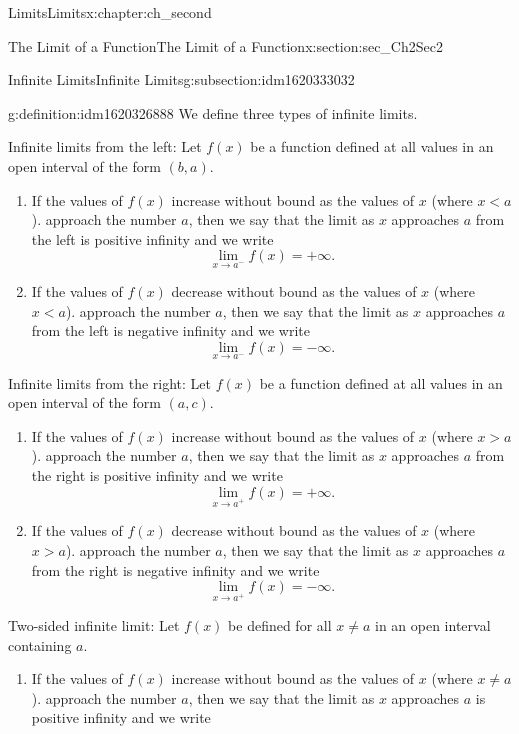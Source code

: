 \documentclass[oneside,10pt,]{book}
\numberwithin{equation}{section}
\newcommand{\lt}{<}
\newcommand{\gt}{>}
\begin{document}
\begin{chapterptx}{Limits}{}{Limits}{}{}{x:chapter:ch_second}
\begin{sectionptx}{The Limit of a Function}{}{The Limit of a Function}{}{}{x:section:sec_Ch2Sec2}
\begin{subsectionptx}{Infinite Limits}{}{Infinite Limits}{}{}{g:subsection:idm1620333032}
\begin{definition}{}{g:definition:idm1620326888}%
We define three types of infinite limits.%
\par
Infinite limits from the left: Let \(f(x)\) be a function defined at all values in an open interval of the form \((b,a).\)%
%
\begin{enumerate}
\item{}If the values of \(f(x)\) increase without bound as the values of \(x\) (where \(x \lt a \)). approach the number \(a \), then we say that the limit as \(x\) approaches \(a \) from the left is positive infinity and we write%
\begin{equation*}
\lim_{x\to a^{-} }f(x)=+\infty.
\end{equation*}
%
\item{}If the values of \(f(x)\) decrease without bound as the values of \(x\) (where \(x \lt a \)). approach the number \(a \), then we say that the limit as \(x\) approaches \(a \) from the left is negative infinity and we write%
\begin{equation*}
\lim_{x\to a^{-} }f(x)=-\infty.
\end{equation*}
%
\end{enumerate}
Infinite limits from the right: Let \(f(x)\) be a function defined at all values in an open interval of the form \((a,c).\)%
%
\begin{enumerate}
\item{}If the values of \(f(x)\) increase without bound as the values of \(x\) (where \(x \gt a \)). approach the number \(a \), then we say that the limit as \(x\) approaches \(a \) from the right is positive infinity and we write%
\begin{equation*}
\lim_{x\to a^{+}}f(x)=+\infty.
\end{equation*}
%
\item{}If the values of \(f(x)\) decrease without bound as the values of \(x\) (where \(x \gt a \)). approach the number \(a \), then we say that the limit as \(x\) approaches \(a \) from the right is negative infinity and we write%
\begin{equation*}
\lim_{x\to a^{+}}f(x)=-\infty.
\end{equation*}
%
\end{enumerate}
Two-sided infinite limit: Let \(f(x)\) be defined for all \(x\neq a\) in an open interval containing \(a \).%
%
\begin{enumerate}
\item{}If the values of \(f(x)\) increase without bound as the values of \(x\) (where \(x \neq a \)). approach the number \(a \), then we say that the limit as \(x\) approaches \(a \) is positive infinity and we write%

\end{enumerate}
\end{definition}
\end{subsectionptx}
\end{sectionptx}
\end{chapterptx}
\end{document}
